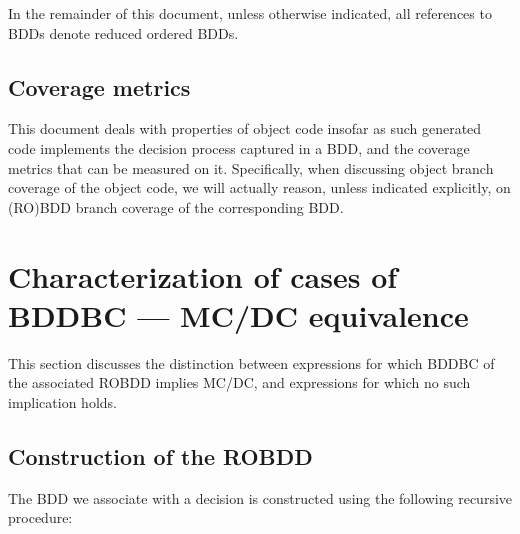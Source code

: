 \documentclass[a4paper,12pt,twoside]{article}
\begin{document}
In the remainder of this document, unless otherwise indicated, all
references to BDDs denote reduced ordered BDDs.

\subsection{Coverage metrics}


This document deals with properties of object code insofar as such
generated code implements the decision process captured in a BDD,
and the coverage metrics that can be measured on it. Specifically,
when discussing object branch coverage of the object code, we will
actually reason, unless indicated explicitly, on (RO)BDD branch coverage
of the corresponding BDD.

\section{Characterization of cases of BDDBC --- MC/DC equivalence}

This section discusses the distinction between expressions for which
BDDBC of the associated ROBDD implies MC/DC, and expressions for which
no such implication holds.

\subsection{Construction of the ROBDD}

The BDD we associate with a decision is constructed using the following
recursive procedure:
\end{document}
